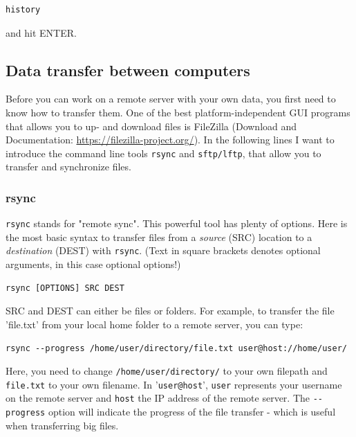 \documentclass[11pt]{article}
\begin{document}
\begin{verbatim}
history
\end{verbatim}

and hit ENTER.

\subsection{Data transfer between computers}
\label{sec:orgheadline14}
Before you can work on a remote server with your own data, you first
need to know how to transfer them.  One of the best
platform-independent GUI programs that allows you to up- and download
files is FileZilla (Download and Documentation:
\url{https://filezilla-project.org/}). In the following lines I want to
introduce the command line tools \texttt{rsync} and \texttt{sftp/lftp}, that allow
you to transfer and synchronize files.
\subsubsection{rsync}
\label{sec:orgheadline11}


\texttt{rsync} stands for "remote sync". This powerful tool has plenty of
options.  Here is the most basic syntax to transfer files from a
\emph{source} (SRC) location to a \emph{destination} (DEST) with \texttt{rsync}. (Text
in square brackets denotes optional arguments, in this case optional
options!)

\begin{verbatim}
rsync [OPTIONS] SRC DEST
\end{verbatim}

SRC and DEST can either be files or folders. For example, to
transfer the file 'file.txt' from your local home folder to a remote
server, you can type:

\begin{verbatim}
rsync --progress /home/user/directory/file.txt user@host://home/user/
\end{verbatim}

Here, you need to change \texttt{/home/user/directory/} to your own filepath and
\texttt{file.txt} to your own filename. In '\texttt{user@host}', \texttt{user}
represents your username on the remote server and \texttt{host} the IP
address of the remote server.  The \texttt{-{}-progress} option will indicate
the progress of the file transfer - which is useful when transferring
big files.
\end{document}
